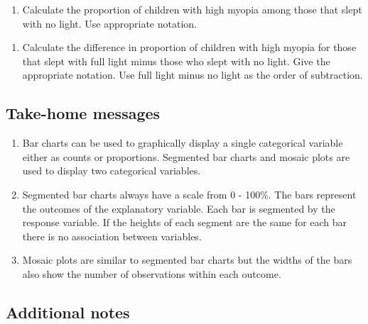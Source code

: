 \documentclass[
]{report}
\providecommand{\tightlist}{%
  \setlength{\itemsep}{0pt}\setlength{\parskip}{0pt}}
\begin{document}
\begin{enumerate}
\def\labelenumi{\arabic{enumi}.}
\setcounter{enumi}{13}
\tightlist
\item
  Calculate the proportion of children with high myopia among those that slept with no light. Use appropriate notation.
\end{enumerate}

\vspace{0.3in}

\begin{enumerate}
\def\labelenumi{\arabic{enumi}.}
\setcounter{enumi}{14}
\tightlist
\item
  Calculate the difference in proportion of children with high myopia for those that slept with full light minus those who slept with no light. Give the appropriate notation. Use full light minus no light as the order of subtraction.
\end{enumerate}

\vspace{0.3in}

\hypertarget{take-home-messages-4}{%
\subsection{Take-home messages}\label{take-home-messages-4}}

\begin{enumerate}
\def\labelenumi{\arabic{enumi}.}
\item
  Bar charts can be used to graphically display a single categorical variable either as counts or proportions. Segmented bar charts and mosaic plots are used to display two categorical variables.
\item
  Segmented bar charts always have a scale from 0 - 100\%. The bars represent the outcomes of the explanatory variable. Each bar is segmented by the response variable. If the heights of each segment are the same for each bar there is no association between variables.
\item
  Mosaic plots are similar to segmented bar charts but the widths of the bars also show the number of observations within each outcome.
\end{enumerate}

\hypertarget{additional-notes-4}{%
\subsection{Additional notes}\label{additional-notes-4}}
\end{document}
